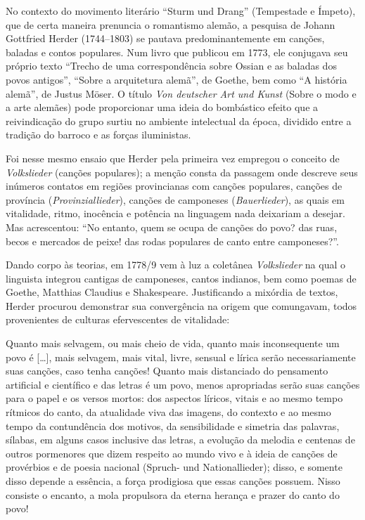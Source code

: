No contexto do movimento literário ``Sturm und Drang'' (Tempestade e
Ímpeto), que de certa maneira prenuncia o romantismo alemão, a pesquisa
de Johann Gottfried Herder (1744--1803) se pautava predominantemente em
canções, baladas e contos populares. Num livro que publicou em
1773, ele conjugava seu próprio texto ``Trecho de uma correspondência
sobre Ossian e as baladas dos povos antigos'', ``Sobre a arquitetura
alemã'', de Goethe, bem como ``A história alemã'', de Justus Möser. O
título \textit{Von deutscher Art und Kunst} (Sobre o modo e a arte
alemães) pode proporcionar uma ideia do bombástico efeito que a
reivindicação do grupo surtiu no ambiente intelectual da época,
dividido entre a tradição do barroco e as forças iluministas. 

Foi nesse mesmo ensaio que Herder pela primeira vez empregou o conceito de
\textit{Volkslieder} (canções populares); a menção consta da passagem onde
descreve seus inúmeros contatos em regiões provincianas com canções
populares, canções de província (\textit{Provinziallieder}), canções de
camponeses (\textit{Bauerlieder}), as quais em vitalidade, ritmo, inocência e
potência na linguagem nada deixariam a desejar. Mas acrescentou: ``No
entanto, quem se ocupa de canções do povo? das ruas, becos e mercados
de peixe! das rodas populares de canto entre camponeses?''.

Dando corpo às teorias, em 1778/9 vem à luz a coletânea \textit{Volkslieder} na
qual o linguista integrou cantigas de camponeses, cantos indianos, bem
como poemas de Goethe, Matthias Claudius e Shakespeare. Justificando a
mixórdia de textos, Herder procurou demonstrar sua convergência na
origem que comungavam, todos provenientes de culturas efervescentes 
de vitalidade:

\begin{hedraquote}
Quanto mais selvagem, ou mais cheio de vida, quanto mais inconsequente
um povo é [\ldots], mais selvagem, mais vital, livre, sensual e lírica
serão necessariamente suas canções, caso tenha canções! Quanto mais
distanciado do pensamento artificial e científico e das letras é um
povo, menos apropriadas serão suas canções para o papel e os versos
mortos: dos aspectos líricos, vitais e ao mesmo tempo rítmicos do
canto, da atualidade viva das imagens, do contexto e ao mesmo tempo da
contundência dos motivos, da sensibilidade e simetria das palavras,
sílabas, em alguns casos inclusive das letras, a evolução da melodia e
centenas de outros pormenores que dizem respeito ao mundo vivo e à
ideia de canções de provérbios e de poesia nacional (Spruch- und
Nationallieder); disso, e somente disso depende a essência, a força
prodigiosa que essas canções possuem. Nisso consiste o encanto, a mola
propulsora da eterna herança e prazer do canto do povo!
\end{hedraquote}


